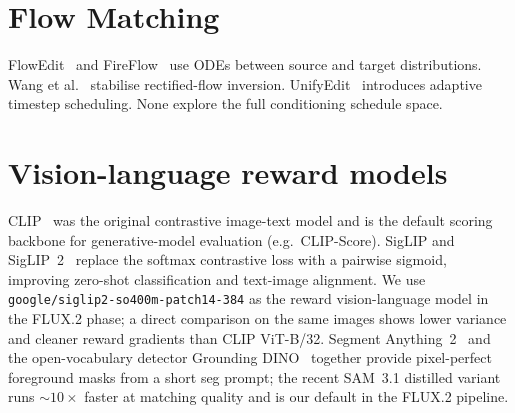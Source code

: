 \section{Flow Matching}

FlowEdit~\cite{kulikov2024flowedit} and FireFlow~\cite{deng2024fireflow} use ODEs between source and target distributions. Wang et al.~\cite{wang2024taming} stabilise rectified-flow inversion. UnifyEdit~\cite{mao2025tuning} introduces adaptive timestep scheduling. None explore the full conditioning schedule space.

\section{Vision-language reward models}

CLIP~\cite{radford2021learning} was the original contrastive image-text model and is the default scoring backbone for generative-model evaluation (e.g.\ CLIP-Score). SigLIP and SigLIP~2~\cite{zhai2023siglip,tschannen2025siglip2} replace the softmax contrastive loss with a pairwise sigmoid, improving zero-shot classification and text-image alignment. We use \texttt{google/siglip2-so400m-patch14-384} as the reward vision-language model in the FLUX.2 phase; a direct comparison on the same images shows lower variance and cleaner reward gradients than CLIP ViT-B/32. Segment Anything~2~\cite{ravi2024sam2} and the open-vocabulary detector Grounding DINO~\cite{liu2024groundingdino} together provide pixel-perfect foreground masks from a short seg prompt; the recent SAM~3.1 distilled variant runs ${\sim}10\times$ faster at matching quality and is our default in the FLUX.2 pipeline.
